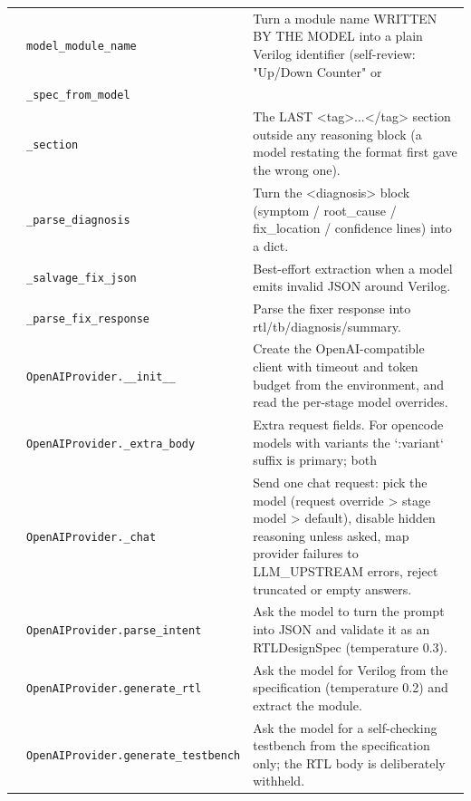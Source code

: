 \begin{longtable}{@{}p{2.8cm}>{\raggedright\arraybackslash}p{4.6cm}p{7.9cm}@{}}
{\small } & \texttt{\small model\_\allowbreak{}module\_\allowbreak{}name} & Turn a module name WRITTEN BY THE MODEL into a plain Verilog identifier (self-review: "Up/Down Counter" or \\
{\small } & \texttt{\small \_\allowbreak{}spec\_\allowbreak{}from\_\allowbreak{}model} &  \\
{\small } & \texttt{\small \_\allowbreak{}section} & The LAST \textless{}tag\textgreater{}...\textless{}/tag\textgreater{} section outside any reasoning block (a model restating the format first gave the wrong one). \\
{\small } & \texttt{\small \_\allowbreak{}parse\_\allowbreak{}diagnosis} & Turn the \textless{}diagnosis\textgreater{} block (symptom / root\_cause / fix\_location / confidence lines) into a dict. \\
{\small } & \texttt{\small \_\allowbreak{}salvage\_\allowbreak{}fix\_\allowbreak{}json} & Best-effort extraction when a model emits invalid JSON around Verilog. \\
{\small } & \texttt{\small \_\allowbreak{}parse\_\allowbreak{}fix\_\allowbreak{}response} & Parse the fixer response into rtl/tb/diagnosis/summary. \\
{\small } & \texttt{\small OpenAIProvider.\allowbreak \_\allowbreak{}\_\allowbreak{}init\_\allowbreak{}\_\allowbreak{}} & Create the OpenAI-compatible client with timeout and token budget from the environment, and read the per-stage model overrides. \\
{\small } & \texttt{\small OpenAIProvider.\allowbreak \_\allowbreak{}extra\_\allowbreak{}body} & Extra request fields. For opencode models with variants the `:variant` suffix is primary; both \\
{\small } & \texttt{\small OpenAIProvider.\allowbreak \_\allowbreak{}chat} & Send one chat request: pick the model (request override \textgreater{} stage model \textgreater{} default), disable hidden reasoning unless asked, map provider failures to LLM\_UPSTREAM errors, reject truncated or empty answers. \\
{\small } & \texttt{\small OpenAIProvider.\allowbreak parse\_\allowbreak{}intent} & Ask the model to turn the prompt into JSON and validate it as an RTLDesignSpec (temperature 0.3). \\
{\small } & \texttt{\small OpenAIProvider.\allowbreak generate\_\allowbreak{}rtl} & Ask the model for Verilog from the specification (temperature 0.2) and extract the module. \\
{\small } & \texttt{\small OpenAIProvider.\allowbreak generate\_\allowbreak{}testbench} & Ask the model for a self-checking testbench from the specification only; the RTL body is deliberately withheld. \\

\end{longtable}
